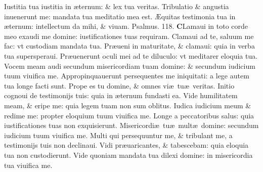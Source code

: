 \documentclass[a5paper,10pt]{book}
\def\ae{æ}
\def\AE{Æ}
\begin{document}
\begin{multicols*}{2}
\newline \color{red} I\color{black}ustitia tua iustitia in \ae ternum: \& lex tua veritas.
\newline \color{red} T\color{black}ribulatio \& angustia inuenerunt me: mandata tua meditatio mea est.
\newline \color{red} \AE \color{black}quitas testimonia tua in \ae ternum: intellectum da mihi, \& viuam. \quad \color{red} Psalmus. \hypertarget{ps118.10}{118.} \color{black}
\vspace{-.5em}
\lettrine[lines=2]{\bfseries \color{red} C}{}Lamaui in toto corde meo exaudi me domine: iustificationes tuas requiram.
\newline \color{red} C\color{black}lamaui ad te, saluum me fac: vt custodiam mandata tua.
\newline \color{red} P\color{black}r\ae ueni in maturitate, \& clamaui: quia in verba tua supersperaui.
\newline \color{red} P\color{black}r\ae uenerunt oculi mei ad te diluculo: vt meditarer eloquia tua.
\newline \color{red} V\color{black}ocem meam audi secundum misericordiam tuam domine: \& secundum iudicium tuum viuifica me.
\newline \color{red} A\color{black}ppropinquauerunt persequentes me iniquitati: a lege autem tua longe facti sunt.
\newline \color{red} P\color{black}rope es tu domine, \& omnes vi\ae \ tu\ae \ veritas.
\newline \color{red} I\color{black}nitio cognoui de testimonijs tuis: quia in \ae ternum fundasti ea.
\newline \color{red} V\color{black}ide humilitatem meam, \& eripe me: quia legem tuam non sum oblitus.
\newline \color{red} I\color{black}udica iudicium meum \& redime me: propter eloquium tuum viuifica me.
\newline \color{red} L\color{black}onge a peccatoribus salus: quia iustificationes tuas non exquisierunt.
\newline \color{red} M\color{black}isericordi\ae \ tu\ae \ mult\ae \ domine: secundum iudicium tuum viuifica me.
\newline \color{red} M\color{black}ulti qui persequuntur me, \& tribulant me, a testimonijs tuis non declinaui.
\newline \color{red} V\color{black}idi pr\ae uaricantes, \& tabescebam: quia eloquia tua non custodierunt.
\newline \color{red} V\color{black}ide quoniam mandata tua dilexi domine: in misericordia tua viuifica me.

\end{multicols*}
\end{document}
